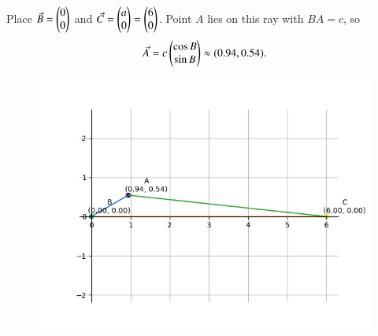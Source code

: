 \documentclass[journal]{IEEEtran}
\begin{document}
Place $\Vec{B}=\begin{pmatrix}0 \\ 0\end{pmatrix}$ and $\Vec{C}=\begin{pmatrix}a \\ 0\end{pmatrix}=\begin{pmatrix}6 \\ 0\end{pmatrix}$.
Point $A$ lies on this ray with $BA=c$, so
\begin{align}
\Vec{A}=c\begin{pmatrix}\cos B \\ \sin B\end{pmatrix}
\approx (0.94, 0.54).
\end{align}
\begin{figure}[h!]
    \centering
    \includegraphics[height=0.6\textheight, keepaspectratio]{figs/fig.png}
    \label{figure_1}
\end{figure}
\end{document}
